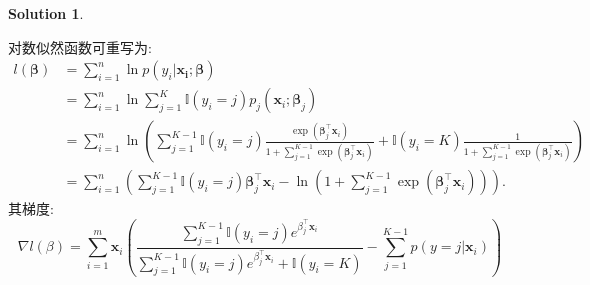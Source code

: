 \documentclass[a4paper,UTF8]{article}
\numberwithin{equation}{section}
\theoremstyle{definition}
\newtheorem*{solution}{Solution}
\def \x {\mathbf{x}}
\begin{document}
\begin{solution}
\begin{enumerate}
		对数似然函数可重写为:
		\begin{align*} l(\boldsymbol{\beta})&=\sum_{i=1}^{n} \ln p\left(y_{i} | \mathbf{x}_{\mathbf{i}} ; \boldsymbol{\beta}\right)\\ &=\sum_{i=1}^{n} \ln\sum_{j=1}^{K} \mathbb{I}(y_i=j) p_j\left(\mathbf{x}_i; \boldsymbol{\beta}_j\right)\\ &=\sum_{i=1}^{n} \ln\left(\sum_{j=1}^{K-1}\mathbb{I}(y_i=j)\frac{\exp \left(\boldsymbol{\beta}_{j}^{\top} \mathbf{x}_i\right)}{1+\sum_{j=1}^{K-1} \exp \left(\boldsymbol{\beta}_{j}^{\top} \mathbf{x}_i\right)}+\mathbb{I}(y_i=K) \frac{1}{1+\sum_{j=1}^{K-1} \exp \left(\boldsymbol{\beta}_{j}^{\top} \mathbf{x}_i\right)}\right)\\ &=\sum_{i=1}^{n} \left(\sum_{j=1}^{K-1}\mathbb{I}(y_i=j)\boldsymbol{\beta}_j^\top \mathbf{x}_i-\ln\left(1+\sum_{j=1}^{K-1}\exp(\boldsymbol{\beta}_j^\top\mathbf{x}_i)\right)\right). \end{align*}
		其梯度:
		\begin{equation*}
			\nabla l(\beta) = \sum_{i=1}^{m}\x_i \left( \frac{\sum_{j=1}^{K-1}\mathbb{I}(y_i=j)e^{\beta_j^\top\x_i}}{\sum_{j=1}^{K-1} \mathbb{I}(y_i=j)e^{\beta_j^\top\x_i}+\mathbb{I}(y_i=K)} - \sum_{j=1}^{K-1} p(y=j|\x_i) \right)
		\end{equation*}
	\end{enumerate}
	~\\
	~\\
	~\\
\end{solution}

\newpage
\end{document}

